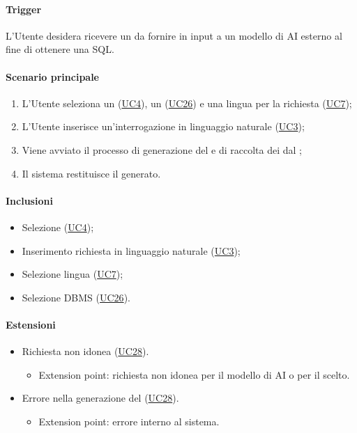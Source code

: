 \paragraph*{Trigger}
L'Utente desidera ricevere un  da fornire in input a un modello di AI esterno al fine di ottenere una  SQL.

\paragraph*{Scenario principale}
\begin{enumerate}
  \item L'Utente seleziona un (\hyperref[UC4]{UC4}), un  (\hyperref[UC26]{UC26}) e una lingua per la richiesta (\hyperref[UC7]{UC7});
  \item L'Utente inserisce un'interrogazione in linguaggio naturale (\hyperref[UC3]{UC3});
  \item Viene avviato il processo di generazione del  e di raccolta dei  dal ;
  \item Il sistema restituisce il  generato.
\end{enumerate}

\paragraph*{Inclusioni}
\begin{itemize}
  \item Selezione  (\hyperref[UC4]{UC4});
  \item Inserimento richiesta in linguaggio naturale (\hyperref[UC3]{UC3});
  \item Selezione lingua (\hyperref[UC7]{UC7});
  \item Selezione DBMS (\hyperref[UC26]{UC26}).
\end{itemize}

\paragraph*{Estensioni}
\begin{itemize}
  \item Richiesta non idonea (\hyperref[UC28]{UC28}).
  \begin{itemize}
    \item Extension point: richiesta non idonea per il modello di AI o per il  scelto.
  \end{itemize}
  \item Errore nella generazione del  (\hyperref[UC28]{UC28}).
    \begin{itemize}
      \item Extension point: errore interno al sistema.
    \end{itemize}
\end{itemize}